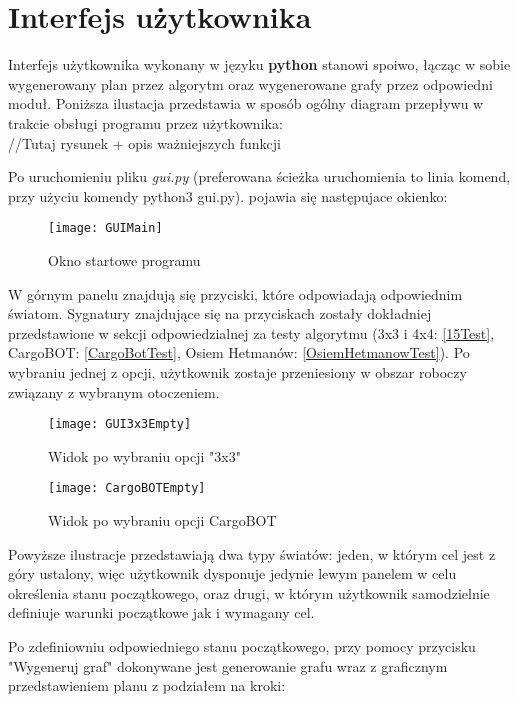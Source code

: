 \section{Interfejs użytkownika}
    Interfejs użytkownika wykonany w języku \textbf{python} stanowi spoiwo, łącząc w sobie wygenerowany plan przez algorytm oraz wygenerowane grafy przez 
    odpowiedni moduł. Poniższa ilustacja przedstawia w sposób ogólny diagram przepływu w trakcie obsługi programu przez użytkownika: \\
    //Tutaj rysunek + opis ważniejszych funkcji

    Po uruchomieniu pliku \textit{gui.py} (preferowana ścieżka uruchomienia to linia komend, przy użyciu komendy python3 gui.py).
    pojawia się następujace okienko:
    \begin{figure}[H]
        \texttt{[image: GUIMain]}
        \centering
        \caption{Okno startowe programu}
    \end{figure}

    W górnym panelu znajdują się przyciski, które odpowiadają odpowiednim światom. Sygnatury znajdujące się na przyciskach zostały 
    dokładniej przedstawione w sekcji odpowiedzialnej za testy algorytmu (3x3 i 4x4: \ref{15Test}, CargoBOT: \ref{CargoBotTest}, 
    Osiem Hetmanów: \ref{OsiemHetmanowTest}). Po wybraniu jednej z opcji, użytkownik zostaje przeniesiony w obszar roboczy związany z wybranym
    otoczeniem.

    \begin{figure}[H]
        \texttt{[image: GUI3x3Empty]}
        \centering
        \caption{Widok po wybraniu opcji "3x3"}
    \end{figure}

    \begin{figure}[H]
        \texttt{[image: CargoBOTEmpty]}
        \centering
        \caption{Widok po wybraniu opcji CargoBOT}
    \end{figure}

    Powyższe ilustracje przedstawiają dwa typy światów: jeden, w którym cel jest z góry ustalony, więc użytkownik dysponuje jedynie lewym panelem w 
    celu określenia stanu początkowego, oraz drugi, w którym użytkownik samodzielnie definiuje warunki początkowe jak i wymagany cel.

    Po zdefiniowniu odpowiedniego stanu początkowego, przy pomocy przycisku "Wygeneruj graf" dokonywane jest generowanie grafu wraz z graficznym 
    przedstawieniem planu z podziałem na kroki:

